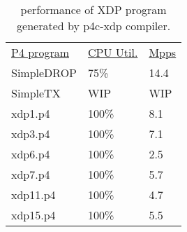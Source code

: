 \begin{table}
\centering
\small
\begin{tabular}{lll}
  \underline{P4 program} & \underline{CPU Util.} & \underline{Mpps} \\
  SimpleDROP & 75\% & 14.4 \\
  SimpleTX & WIP & WIP \\
  xdp1.p4 &  100\% &  8.1 \\
  xdp3.p4 &  100\% &  7.1 \\
  xdp6.p4 &  100\% &  2.5 \\
  xdp7.p4 &  100\% &  5.7 \\
  xdp11.p4 &  100\% &  4.7 \\
  xdp15.p4 &  100\% &  5.5 \\
\end{tabular}
\caption{\footnotesize performance of XDP program generated by
  p4c-xdp compiler.}
\label{table:treebuild}
\end{table}
